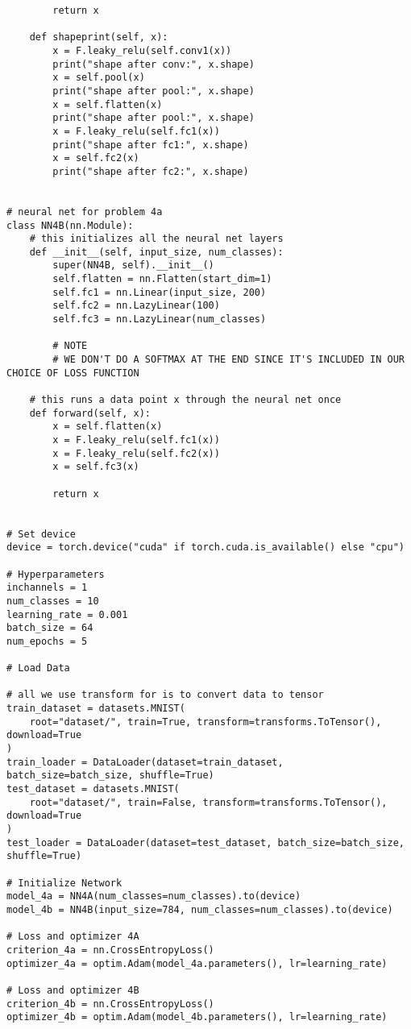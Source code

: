 \begin{verbatim}
        return x

    def shapeprint(self, x):
        x = F.leaky_relu(self.conv1(x))
        print("shape after conv:", x.shape)
        x = self.pool(x)
        print("shape after pool:", x.shape)
        x = self.flatten(x)
        print("shape after pool:", x.shape)
        x = F.leaky_relu(self.fc1(x))
        print("shape after fc1:", x.shape)
        x = self.fc2(x)
        print("shape after fc2:", x.shape)


# neural net for problem 4a
class NN4B(nn.Module):
    # this initializes all the neural net layers
    def __init__(self, input_size, num_classes):
        super(NN4B, self).__init__()
        self.flatten = nn.Flatten(start_dim=1)
        self.fc1 = nn.Linear(input_size, 200)
        self.fc2 = nn.LazyLinear(100)
        self.fc3 = nn.LazyLinear(num_classes)

        # NOTE
        # WE DON'T DO A SOFTMAX AT THE END SINCE IT'S INCLUDED IN OUR CHOICE OF LOSS FUNCTION

    # this runs a data point x through the neural net once
    def forward(self, x):
        x = self.flatten(x)
        x = F.leaky_relu(self.fc1(x))
        x = F.leaky_relu(self.fc2(x))
        x = self.fc3(x)

        return x


# Set device
device = torch.device("cuda" if torch.cuda.is_available() else "cpu")

# Hyperparameters
inchannels = 1
num_classes = 10
learning_rate = 0.001
batch_size = 64
num_epochs = 5

# Load Data

# all we use transform for is to convert data to tensor
train_dataset = datasets.MNIST(
    root="dataset/", train=True, transform=transforms.ToTensor(), download=True
)
train_loader = DataLoader(dataset=train_dataset, batch_size=batch_size, shuffle=True)
test_dataset = datasets.MNIST(
    root="dataset/", train=False, transform=transforms.ToTensor(), download=True
)
test_loader = DataLoader(dataset=test_dataset, batch_size=batch_size, shuffle=True)

# Initialize Network
model_4a = NN4A(num_classes=num_classes).to(device)
model_4b = NN4B(input_size=784, num_classes=num_classes).to(device)

# Loss and optimizer 4A
criterion_4a = nn.CrossEntropyLoss()
optimizer_4a = optim.Adam(model_4a.parameters(), lr=learning_rate)

# Loss and optimizer 4B
criterion_4b = nn.CrossEntropyLoss()
optimizer_4b = optim.Adam(model_4b.parameters(), lr=learning_rate)


\end{verbatim}
